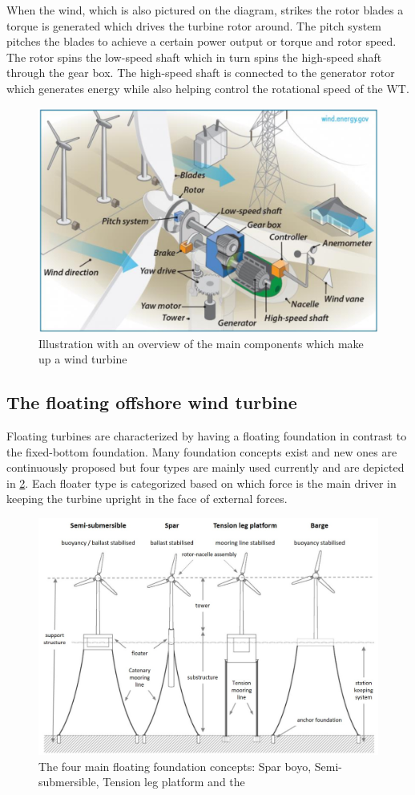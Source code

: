 When the wind, which is also pictured on the diagram, strikes the rotor blades a torque is generated which drives the turbine rotor around. The pitch system pitches the blades to achieve a certain power output or torque and rotor speed. The rotor spins the low-speed shaft which in turn spins the high-speed shaft through the gear box. The high-speed shaft is connected to the generator rotor which generates energy while also helping control the rotational speed of the WT.
\begin{figure}[h]
	\centering
	\includegraphics[width=0.7\linewidth]{Graphics/WtComponents.png}
	\caption{Illustration with an overview of the main components which make up a wind turbine}
	\label{fig:wt_components}
\end{figure}

\subsection{The floating offshore wind turbine}
Floating turbines are characterized by having a floating foundation in contrast to the fixed-bottom foundation. Many foundation concepts exist and new ones are continuously proposed but four types are mainly used currently and are depicted in \cref{fig:floating_concepts}. Each floater type is categorized based on which force is the main driver in keeping the turbine upright in the face of external forces.
\begin{figure}[h]
	\centering
	\includegraphics[width=1\linewidth]{Graphics/FloatingFoundationConcepts.jpg}
	\caption{The four main floating foundation concepts: Spar boyo, Semi-submersible, Tension leg platform and the \cite{DNV-GL2018}}
	\label{fig:floating_concepts}
\end{figure}

